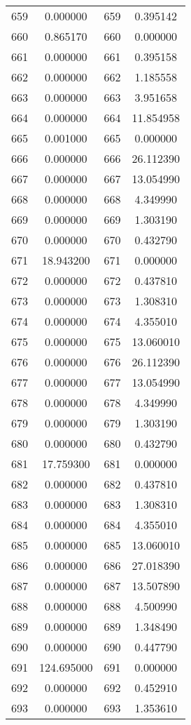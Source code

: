 \documentclass[12pt]{article}
\begin{document}
\begin{longtable}{@{}cccc@{}}
659 & 0.000000 & 659 & 0.395142 \\
660 & 0.865170 & 660 & 0.000000 \\
661 & 0.000000 & 661 & 0.395158 \\
662 & 0.000000 & 662 & 1.185558 \\
663 & 0.000000 & 663 & 3.951658 \\
664 & 0.000000 & 664 & 11.854958 \\
665 & 0.001000 & 665 & 0.000000 \\
666 & 0.000000 & 666 & 26.112390 \\
667 & 0.000000 & 667 & 13.054990 \\
668 & 0.000000 & 668 & 4.349990 \\
669 & 0.000000 & 669 & 1.303190 \\
670 & 0.000000 & 670 & 0.432790 \\
671 & 18.943200 & 671 & 0.000000 \\
672 & 0.000000 & 672 & 0.437810 \\
673 & 0.000000 & 673 & 1.308310 \\
674 & 0.000000 & 674 & 4.355010 \\
675 & 0.000000 & 675 & 13.060010 \\
676 & 0.000000 & 676 & 26.112390 \\
677 & 0.000000 & 677 & 13.054990 \\
678 & 0.000000 & 678 & 4.349990 \\
679 & 0.000000 & 679 & 1.303190 \\
680 & 0.000000 & 680 & 0.432790 \\
681 & 17.759300 & 681 & 0.000000 \\
682 & 0.000000 & 682 & 0.437810 \\
683 & 0.000000 & 683 & 1.308310 \\
684 & 0.000000 & 684 & 4.355010 \\
685 & 0.000000 & 685 & 13.060010 \\
686 & 0.000000 & 686 & 27.018390 \\
687 & 0.000000 & 687 & 13.507890 \\
688 & 0.000000 & 688 & 4.500990 \\
689 & 0.000000 & 689 & 1.348490 \\
690 & 0.000000 & 690 & 0.447790 \\
691 & 124.695000 & 691 & 0.000000 \\
692 & 0.000000 & 692 & 0.452910 \\
693 & 0.000000 & 693 & 1.353610 \\

\end{longtable}
\end{document}
